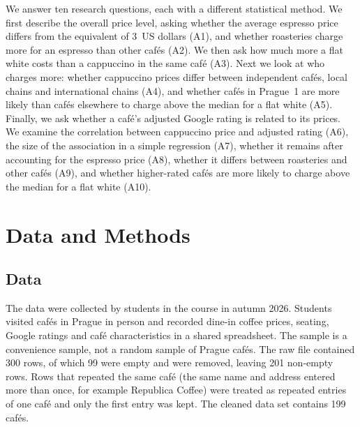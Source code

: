\documentclass[11pt,a4paper]{article}
\begin{document}
We answer ten research questions, each with a different statistical method. We first describe the overall price level, asking whether the average espresso price differs from the equivalent of 3~US dollars (A1), and whether roasteries charge more for an espresso than other caf\'es (A2). We then ask how much more a flat white costs than a cappuccino in the same caf\'e (A3). Next we look at who charges more: whether cappuccino prices differ between independent caf\'es, local chains and international chains (A4), and whether caf\'es in Prague~1 are more likely than caf\'es elsewhere to charge above the median for a flat white (A5). Finally, we ask whether a caf\'e's adjusted Google rating is related to its prices. We examine the correlation between cappuccino price and adjusted rating (A6), the size of the association in a simple regression (A7), whether it remains after accounting for the espresso price (A8), whether it differs between roasteries and other caf\'es (A9), and whether higher-rated caf\'es are more likely to charge above the median for a flat white (A10).

\section{Data and Methods}

\subsection{Data}

The data were collected by students in the course in autumn 2026. Students visited caf\'es in Prague in person and recorded dine-in coffee prices, seating, Google ratings and caf\'e characteristics in a shared spreadsheet. The sample is a convenience sample, not a random sample of Prague caf\'es. The raw file contained 300 rows, of which 99 were empty and were removed, leaving 201 non-empty rows. Rows that repeated the same caf\'e (the same name and address entered more than once, for example Republica Coffee) were treated as repeated entries of one caf\'e and only the first entry was kept. The cleaned data set contains 199 caf\'es.
\end{document}
